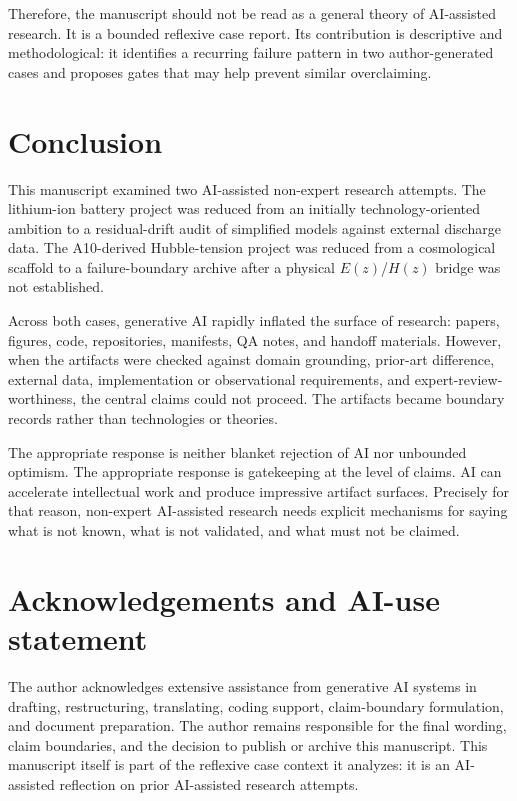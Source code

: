 \documentclass[a4paper,11pt]{article}
\begin{document}
Therefore, the manuscript should not be read as a general theory of AI-assisted research. It is a bounded reflexive case report. Its contribution is descriptive and methodological: it identifies a recurring failure pattern in two author-generated cases and proposes gates that may help prevent similar overclaiming.

\section{Conclusion}

This manuscript examined two AI-assisted non-expert research attempts. The lithium-ion battery project was reduced from an initially technology-oriented ambition to a residual-drift audit of simplified models against external discharge data. The A10-derived Hubble-tension project was reduced from a cosmological scaffold to a failure-boundary archive after a physical $E(z)$/$H(z)$ bridge was not established.

Across both cases, generative AI rapidly inflated the surface of research: papers, figures, code, repositories, manifests, QA notes, and handoff materials. However, when the artifacts were checked against domain grounding, prior-art difference, external data, implementation or observational requirements, and expert-review-worthiness, the central claims could not proceed. The artifacts became boundary records rather than technologies or theories.

The appropriate response is neither blanket rejection of AI nor unbounded optimism. The appropriate response is gatekeeping at the level of claims. AI can accelerate intellectual work and produce impressive artifact surfaces. Precisely for that reason, non-expert AI-assisted research needs explicit mechanisms for saying what is not known, what is not validated, and what must not be claimed.

\section*{Acknowledgements and AI-use statement}

The author acknowledges extensive assistance from generative AI systems in drafting, restructuring, translating, coding support, claim-boundary formulation, and document preparation. The author remains responsible for the final wording, claim boundaries, and the decision to publish or archive this manuscript. This manuscript itself is part of the reflexive case context it analyzes: it is an AI-assisted reflection on prior AI-assisted research attempts.
\end{document}
